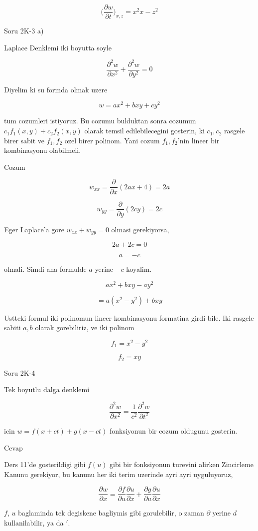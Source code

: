\documentclass[12pt,fleqn]{article}\usepackage{../common}
\begin{document}
\[ \bigg( \frac{\partial w}{\partial t}  \bigg)_{x,z} = x^2x-z^2 \]

Soru 2K-3 a)

Laplace Denklemi iki boyutta soyle

\[ \frac{\partial^2 w}{\partial x^2} + 
\frac{\partial^2 w}{\partial y^2}  = 0
 \]

Diyelim ki su formda olmak uzere

\[ w = ax^2 + bxy + cy^2 \]

tum cozumleri istiyoruz. Bu cozumu bulduktan sonra cozumun $c_1f_1(x,y) +
c_2f_2(x,y)$ 
olarak temsil edilebilecegini gosterin, ki $c_1,c_2$ rasgele
birer sabit ve $f_1,f_2$ ozel birer polinom. Yani cozum $f_1,f_2$'nin
lineer bir kombinasyonu olabilmeli.

Cozum 

\[ w_{xx} = \frac{\partial }{\partial x} (2ax + 4) = 2a \]

\[ w_{yy} = \frac{\partial }{\partial y} (2cy) = 2c \]

Eger Laplace'a gore $w_{xx} + w_{yy} = 0$ olmasi gerekiyorsa,

\[ 2a + 2c = 0 \]

\[ a = -c \]

olmali. Simdi ana formulde $a$ yerine $-c$ koyalim. 

\[ ax^2 + bxy -ay^2 \]

\[ = a(x^2-y^2) + bxy \]

Ustteki formul iki polinomun lineer kombinasyonu formatina girdi bile. Iki
rasgele sabiti $a,b$ olarak gorebiliriz, ve iki polinom

\[ f_1 = x^2-y^2 \]

\[ f_2 = xy \]

Soru 2K-4

Tek boyutlu dalga denklemi 

\[ \frac{\partial ^2w}{\partial x^2} = \frac{ 1}{c^2} 
\frac{\partial ^2w}{\partial t^2} \]

icin $w = f(x+ct) + g(x-ct)$ fonksiyonun bir cozum oldugunu gosterin. 

Cevap 

Ders 11'de gosterildigi gibi $f(u)$ gibi bir fonksiyonun turevini alirken
Zincirleme Kanunu gerekiyor, bu kanunu her iki terim uzerinde ayri ayri
uyguluyoruz,

\[ \frac{\partial w}{\partial x}  = 
\frac{\partial f}{\partial u}
\frac{\partial u}{\partial x} + 
\frac{\partial g}{\partial u}
\frac{\partial u}{\partial x} 
\]

$f$, $u$ baglaminda tek degiskene bagliymis gibi gorulebilir, o zaman
$\partial$ yerine $d$ kullanilabilir, ya da $'$. 
\end{document}
